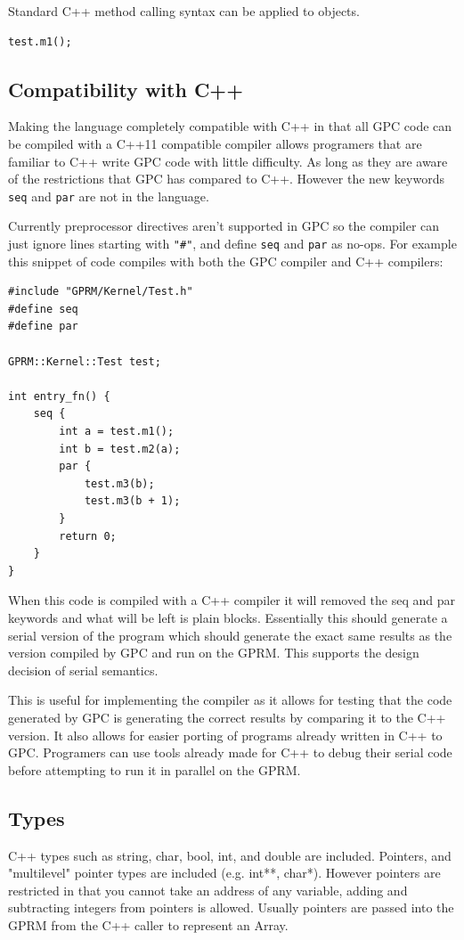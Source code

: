 Standard C++ method calling syntax can be applied to objects.
\begin{lstlisting}[style=myGPC]
test.m1();
\end{lstlisting}



\subsection{Compatibility with C++}
Making the language completely compatible with C++ in that all GPC code can be
compiled with a C++11 compatible compiler allows programers that are familiar to
C++ write GPC code with little difficulty. As long as they are aware of the restrictions
that GPC has compared to C++. However the new keywords \texttt{seq} and \texttt{par} are not in the language.

Currently preprocessor directives aren't supported in GPC so the compiler can
just ignore lines starting with \texttt{"\#"}, and define \texttt{seq} and \texttt{par} as no-ops. 
For example this snippet of code compiles with both the GPC compiler and 
C++ compilers:

\begin{lstlisting}[style=myGPC]
#include "GPRM/Kernel/Test.h"
#define seq
#define par

GPRM::Kernel::Test test;

int entry_fn() {
    seq {
        int a = test.m1();
        int b = test.m2(a);        
        par {
            test.m3(b);
            test.m3(b + 1);
        }
        return 0;
    }
}
\end{lstlisting}

When this code is compiled with a C++ compiler it will removed the seq and par
keywords and what will be left is plain blocks. Essentially this should generate a
serial version of the program which should generate the exact same results
as the version compiled by GPC and run on the GPRM. This supports the 
design decision of serial semantics.

This is useful for implementing the compiler as it allows for
testing that the code generated by GPC is generating the correct results
by comparing it to the C++ version. It also allows for easier porting of
programs already written in C++ to GPC. Programers can use tools
already made for C++ to debug their serial code before attempting
to run it in parallel on the GPRM.

\subsection{Types}
        C++ types such as string, char, bool, int, and double are included.
        Pointers, and "multilevel" pointer types are included (e.g. int**, char*).
        However pointers are restricted in that you cannot take
        an address of any variable, adding and subtracting integers
        from pointers is allowed. Usually pointers are passed into
        the GPRM from the C++ caller to represent an Array.

